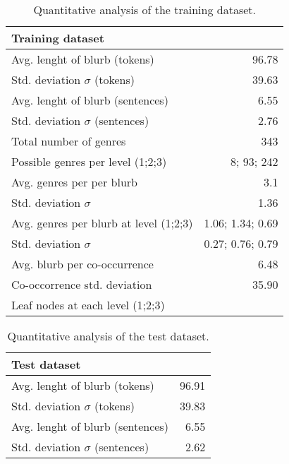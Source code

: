 \documentclass[11pt]{article}
\begin{document}
\begin{table}
\begin{center}
\begin{tabular}{|l|r|}
\hline\centering\textbf{Training dataset}  &                    \\
\hline
Avg. lenght of blurb (tokens)              &  96.78             \\
Std. deviation $\sigma$ (tokens)           &  39.63             \\
Avg. lenght of blurb (sentences)           &  6.55              \\
Std. deviation $\sigma$ (sentences)        &  2.76              \\
\hline
Total number of genres                     &  343               \\
Possible genres per level (1;2;3)          &  8; 93; 242        \\
Avg. genres per per blurb                  &  3.1               \\
Std. deviation $\sigma$                    &  1.36              \\
Avg. genres per blurb at level (1;2;3)     &  1.06; 1.34; 0.69  \\
Std. deviation $\sigma$                    &  0.27; 0.76; 0.79  \\
\hline
Avg. blurb per co-occurrence               &  6.48              \\  %
Co-occorrence std. deviation               & 35.90              \\
Leaf nodes at each level (1;2;3)           &                    \\  %
\hline
\end{tabular}
\end{center}
\caption{\label{quantitivy-analysis-train}Quantitative analysis of the training dataset.}
\end{table}


\begin{table}
\begin{center}
\begin{tabular}{|l|r|}
\hline\centering\textbf{Test dataset}  &         \\
\hline
Avg. lenght of blurb (tokens)              &  96.91             \\
Std. deviation $\sigma$ (tokens)           &  39.83             \\
Avg. lenght of blurb (sentences)           &  6.55              \\
Std. deviation $\sigma$ (sentences)        &  2.62              \\
\hline
\end{tabular}
\end{center}
\caption{\label{quantitivy-analysis-test}Quantitative analysis of the test dataset.}
\end{table}
\end{document}
